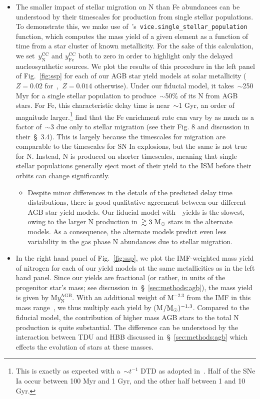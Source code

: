 \documentclass[ms.tex]{subfiles}
\begin{document}
\begin{itemize} 
	\item The smaller impact of stellar migration on N than Fe abundances can 
	be understood by their timescales for production from single stellar 
	populations. 
	To demonstrate this, we make use 
	of~\vice's~\texttt{vice.single\_stellar\_population} function, which 
	computes the mass yield of a given element as a function of time from a 
	star cluster of known metallicity. 
	For the sake of this calculation, we set~$y_\text{N}^\text{CC}$ and 
	$y_\text{Fe}^\text{CC}$ both to zero in order to highlight only the 
	delayed nucleosynthetic sources. 
	We plot the results of this procedure in the left panel of 
	Fig.~\ref{fig:ssp} for each of our AGB star yield models at solar 
	metallicity ($Z = 0.02$ for~\karakasten,~$Z = 0.014$ otherwise). 
	Under our fiducial model, it takes~$\sim$250 Myr for a single stellar 
	population to produce~$\sim$50\% of its N from AGB stars. 
	For Fe, this characteristic delay time is near~$\sim$1 Gyr, an order of 
	magnitude larger.\footnote{
		This is exactly as expected with a~$\sim t^{-1}$ DTD as adopted 
		in~\citet{Johnson2021}. 
		Half of the SNe Ia occur between 100 Myr and 1 Gyr, and the other half 
		between 1 and 10 Gyr. 
	} 
	\citet{Johnson2021} find that the Fe enrichment rate can vary by as much 
	as a factor of~$\sim$3 due only to stellar migration (see their Fig. 8 and 
	discussion in their~\S~3.4). 
	This is largely because the timescales for migration are comparable to the 
	timescales for SN Ia explosions, but the same is not true for N. 
	Instead, N is produced on shorter timescales, meaning that single stellar 
	populations generally eject most of their yield to the ISM before their 
	orbits can change significantly. 
	\begin{itemize} 
		\item Despite minor differences in the details of the predicted delay 
		time distributions, there is good qualitative agreement between our 
		different AGB star yield models. 
		Our fiducial model with~\cristallo~yields is the slowest, owing to the 
		larger N production in~$\gtrsim3\ \text{M}_\odot$ stars in the alternate 
		models. 
		As a consequence, the alternate models predict even less variability 
		in the gas phase N abundances due to stellar migration. 
	\end{itemize} 

	\item In the right hand panel of Fig.~\ref{fig:ssp}, we plot the 
	IMF-weighted mass yield of nitrogen for each of our yield models at the 
	same metallicities as in the left hand panel. 
	Since our yields are fractional (or rather, in units of the progenitor 
	star's mass; see discussion in~\S~\ref{sec:methods:agb}), the mass 
	yield is given by M$y_\text{N}^\text{AGB}$. 
	With an additional weight of M$^{-2.3}$ from the IMF in this mass 
	range~\citep{Kroupa2001}, we thus multiply each yield 
	by (M$/\text{M}_\odot)^{-1.3}$. 
	Compared to the fiducial model, the contribution of higher mass AGB stars 
	to the total N production is quite substantial. 
	The difference can be understood by the interaction between TDU and HBB 
	discussed in~\S~\ref{sec:methods:agb} which effects the evolution 
	of stars at these masses. 


\end{itemize}
\end{document}
